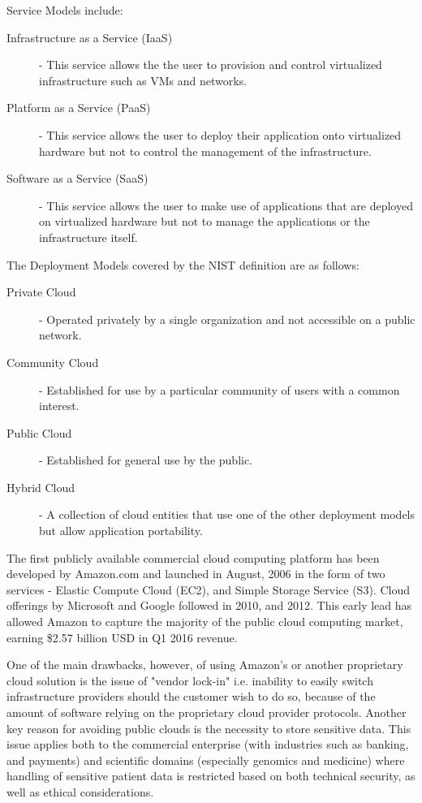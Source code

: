 Service Models include:

\begin{description}
\item [Infrastructure as a Service (IaaS)] - This service allows the the user to provision and control virtualized infrastructure such as VMs and networks.
\item [Platform as a Service (PaaS)] - This service allows the user to deploy their application onto virtualized hardware but not to control the management of the infrastructure.
\item [Software as a Service (SaaS)] - This service allows the user to make use of applications that are deployed on virtualized hardware but not to manage the applications or the infrastructure itself.
\end{description}

The Deployment Models covered by the NIST definition are as follows:

\begin{description}
\item [Private Cloud] - Operated privately by a single organization and not accessible on a public network.
\item [Community Cloud] - Established for use by a particular community of users with a common interest.
\item [Public Cloud] - Established for general use by the public.
\item [Hybrid Cloud] - A collection of cloud entities that use one of the other deployment models but allow application portability.
\end{description}

The first publicly available commercial cloud computing platform has been developed by Amazon.com and launched in August, 2006 in the form of two services - Elastic Compute Cloud (EC2), and Simple Storage Service (S3). Cloud offerings by Microsoft and Google followed in 2010, and 2012. This early lead has allowed Amazon to capture the majority of the public cloud computing market, earning \$2.57 billion USD in Q1 2016 revenue.

One of the main drawbacks, however, of using Amazon's or another proprietary cloud solution is the issue of "vendor lock-in" i.e. inability to easily switch infrastructure providers should the customer wish to do so, because of the amount of software relying on the proprietary cloud provider protocols. Another key reason for avoiding public clouds is the necessity to store sensitive data. This issue applies both to the commercial enterprise (with industries such as banking, and payments) and scientific domains (especially genomics and medicine) where handling of sensitive patient data is restricted based on both technical security, as well as ethical considerations\autocite{knoppers2005human}.

